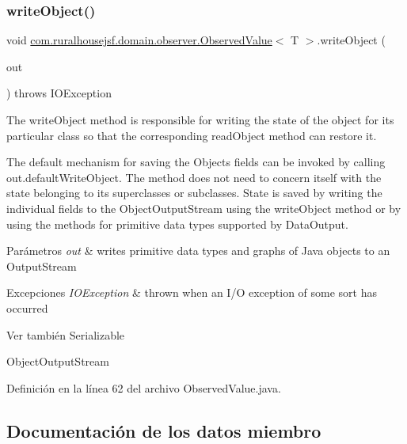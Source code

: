 \subsubsection{\texorpdfstring{writeObject()}{writeObject()}}
{\footnotesize\ttfamily void \mbox{\hyperlink{a00180}{com.\+ruralhousejsf.\+domain.\+observer.\+Observed\+Value}}$<$ T $>$.write\+Object (\begin{DoxyParamCaption}\item[{Object\+Output\+Stream}]{out }\end{DoxyParamCaption}) throws I\+O\+Exception\hspace{0.3cm}{\ttfamily [private]}}



The write\+Object method is responsible for writing the state of the object for its particular class so that the corresponding read\+Object method can restore it. 

The default mechanism for saving the Object\textquotesingle{}s fields can be invoked by calling out.\+default\+Write\+Object. The method does not need to concern itself with the state belonging to its superclasses or subclasses. State is saved by writing the individual fields to the Object\+Output\+Stream using the write\+Object method or by using the methods for primitive data types supported by Data\+Output.


\begin{DoxyParams}{Parámetros}
{\em out} & writes primitive data types and graphs of Java objects to an Output\+Stream \\
\hline
\end{DoxyParams}

\begin{DoxyExceptions}{Excepciones}
{\em I\+O\+Exception} & thrown when an I/O exception of some sort has occurred \\
\hline
\end{DoxyExceptions}
\begin{DoxySeeAlso}{Ver también}
Serializable 

Object\+Output\+Stream 
\end{DoxySeeAlso}


Definición en la línea 62 del archivo Observed\+Value.\+java.



\subsection{Documentación de los datos miembro}
\mbox{\label{a00180_a01052aac89cda6c5f230343d40b54e89}} 

